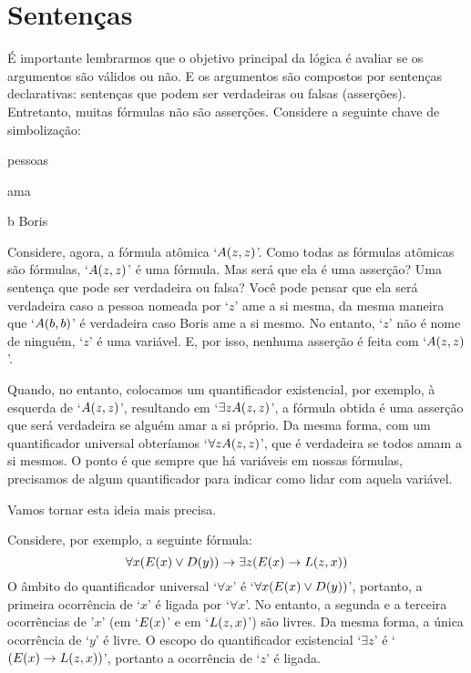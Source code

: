 \section{Sentenças}
É importante lembrarmos que o objetivo principal da lógica é avaliar se os argumentos são válidos ou não.
E os argumentos são compostos por sentenças declarativas:
sentenças que podem ser verdadeiras ou falsas (asserções).
Entretanto, muitas fórmulas não são asserções.
Considere a seguinte chave de simbolização:
\begin{center}
	\begin{ekey}
		\item[\text{domínio}] pessoas
		\item[\atom{A}{x,y}]  ama 
		\item[b] Boris
	\end{ekey}
\end{center}
Considere, agora, a fórmula atômica `$\mathord{A}(z,z)$'.
Como todas as fórmulas atômicas são fórmulas, `$\mathord{A}(z,z)$' é uma fórmula. Mas será que ela é uma asserção? Uma sentença que pode ser verdadeira ou falsa?
Você pode pensar que ela será verdadeira caso a pessoa nomeada por `$z$' ame a si mesma, da mesma maneira que `$\mathord{A}(b,b)$' é verdadeira caso Boris ame a si mesmo.
No entanto, `$z$' não é nome de ninguém, `$z$' é uma variável.
E, por isso, nenhuma asserção é feita com `$\mathord{A}(z,z)$'.

Quando, no entanto, colocamos um quantificador existencial, por exemplo, à esquerda de `$\mathord{A}(z,z)$', resultando em `$\exists z \mathord{A}(z,z)$', a fórmula obtida é uma asserção  que será verdadeira se alguém amar a si próprio.
Da mesma forma, com um quantificador universal obteríamos `$\forall z \mathord{A}(z,z)$', que é verdadeira se todos amam a si mesmos.
O ponto é que sempre que há variáveis em nossas fórmulas, precisamos de algum quantificador para indicar como lidar com aquela variável.

Vamos tornar esta ideia mais precisa.
        
Considere, por exemplo, a seguinte fórmula:
	$$\forall x(\mathord{E}(x) \vee \mathord{D}(y)) \rightarrow \exists z(\mathord{E}(x) \rightarrow \mathord{L}(z,x))$$
O âmbito do quantificador universal `$\forall x$' é `$\forall x (\mathord{E}(x) \vee \mathord{D}(y))$', portanto, a primeira ocorrência de `$x$' é ligada por `$\forall x$'.
No entanto, a segunda e a terceira ocorrências de '$x$' (em `$\mathord{E}(x)$' e em `$\mathord{L}(z,x)$') são livres.
Da mesma forma, a única ocorrência de `$y$' é livre.
O escopo do quantificador existencial `$\exists z$' é `$(\mathord{E}(x) \rightarrow \mathord{L}(z,x))$', portanto a ocorrência de `$z$' é ligada.

